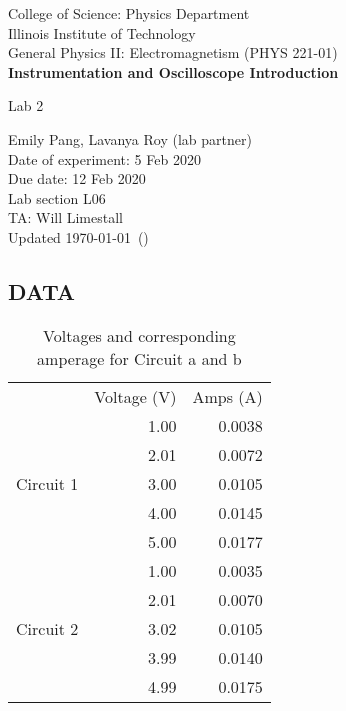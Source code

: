 \documentclass [12pt, letterpaper, twoside] {article}
\begin{document}
\begin {titlepage}
\begin {center}
College of Science: Physics Department \\
\vspace {0.1cm}
Illinois Institute of Technology\\
\vspace {0.1cm}
General Physics II: Electromagnetism (PHYS 221-01)\\
\vspace* {\fill}
\begingroup
\Large
\textbf {Instrumentation and Oscilloscope Introduction}
\vspace {0.35cm}

\normalsize
Lab 2
\vspace {1.5cm}
\endgroup
\vspace* {\fill}
\end {center}

\vspace*{\fill}
\begin {flushright}
\footnotesize
Emily Pang, Lavanya Roy (lab partner) \\
Date of experiment: 5 Feb 2020 \\
Due date: 12 Feb 2020 \\
Lab section L06 \\
TA: Will Limestall \\
Updated \usdate\today~(\currenttime)
\end {flushright}
\end {titlepage}

\subsection* {DATA}
\begin{table}[h!]
  \centering
  \begin{tabular}{| c | r | r |}
    \hline\hline
    & Voltage (V) & Amps (A) \\
    \cline{2-3}
    \multirow {5}{*}{Circuit 1} & 1.00 & 0.0038 \\
    \cline{2-3}
    & 2.01 & 0.0072 \\
    \cline{2-3}
    & 3.00 & 0.0105 \\
    \cline{2-3}
    & 4.00 & 0.0145 \\
    \cline{2-3}
    & 5.00 & 0.0177 \\
    \hline
    \multirow {5}{*}{Circuit 2} & 1.00 & 0.0035 \\
    \cline{2-3}
    & 2.01 & 0.0070 \\
    \cline{2-3}
    & 3.02 & 0.0105 \\
    \cline{2-3}
    & 3.99 & 0.0140 \\
    \cline{2-3}
    & 4.99 & 0.0175 \\
    \hline\hline
  \end{tabular}
  \caption{Voltages and corresponding amperage for Circuit a and b}
\end{table}
\end{document}
